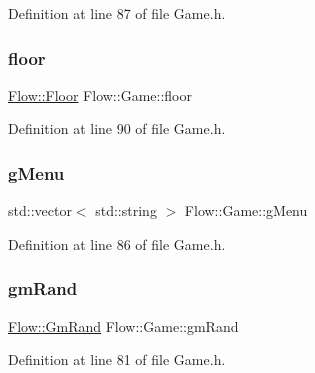 Definition at line 87 of file Game.\+h.

\hypertarget{struct_flow_1_1_game_adcb177a0b639e9a3919ad9360b89c217}{}\label{struct_flow_1_1_game_adcb177a0b639e9a3919ad9360b89c217} 
\subsubsection{\texorpdfstring{floor}{floor}}
{\footnotesize\ttfamily \hyperlink{class_flow_1_1_floor}{Flow\+::\+Floor} Flow\+::\+Game\+::floor\hspace{0.3cm}{\ttfamily [static]}}



Definition at line 90 of file Game.\+h.

\hypertarget{struct_flow_1_1_game_abf561ad69faaf819c7b2f2cc62dfae5e}{}\label{struct_flow_1_1_game_abf561ad69faaf819c7b2f2cc62dfae5e} 
\subsubsection{\texorpdfstring{g\+Menu}{gMenu}}
{\footnotesize\ttfamily std\+::vector$<$ std\+::string $>$ Flow\+::\+Game\+::g\+Menu\hspace{0.3cm}{\ttfamily [static]}}



Definition at line 86 of file Game.\+h.

\hypertarget{struct_flow_1_1_game_a2472db93858dc5cd513379328fe1bf5b}{}\label{struct_flow_1_1_game_a2472db93858dc5cd513379328fe1bf5b} 
\subsubsection{\texorpdfstring{gm\+Rand}{gmRand}}
{\footnotesize\ttfamily \hyperlink{class_flow_1_1_gm_rand}{Flow\+::\+Gm\+Rand} Flow\+::\+Game\+::gm\+Rand\hspace{0.3cm}{\ttfamily [static]}}



Definition at line 81 of file Game.\+h.

\hypertarget{struct_flow_1_1_game_a25fd62c3ab045d2c4e94920359a83a88}{}\label{struct_flow_1_1_game_a25fd62c3ab045d2c4e94920359a83a88} 
